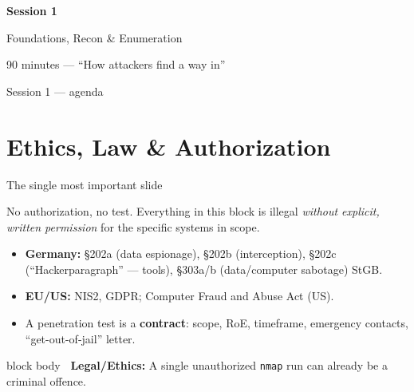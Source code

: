 \documentclass[aspectratio=169,11pt]{beamer}
\newcommand{\legalbox}[1]{%
  \begin{beamercolorbox}[wd=\textwidth,sep=6pt,rounded=true]{block body}%
  \color{warnRed}\textbf{\faExclamationTriangle\ Legal/Ethics:} #1%
  \end{beamercolorbox}}
\newcommand{\sessionbanner}[3]{%
  \begin{frame}[standout]
    {\Large\textbf{Session #1}}\par\vspace{0.6em}
    {#2}\par\vspace{0.8em}
    {\small\color{kaliBlue}#3}
  \end{frame}}
\begin{document}
\sessionbanner{1}{Foundations, Recon \& Enumeration}{90 minutes --- ``How attackers find a way in''}

\begin{frame}{Session 1 --- agenda}\tableofcontents[sections={1-6}]\end{frame}

\section{Ethics, Law \& Authorization}
\begin{frame}{The single most important slide}
  \begin{alertblock}{No authorization, no test.}
    Everything in this block is illegal \emph{without explicit, written
    permission} for the specific systems in scope.
  \end{alertblock}
  \vspace{0.4em}
  \begin{itemize}
    \item \textbf{Germany:} \S202a (data espionage), \S202b (interception),
          \S202c (``Hackerparagraph'' --- tools), \S303a/b (data/computer
          sabotage) StGB.
    \item \textbf{EU/US:} NIS2, GDPR; Computer Fraud and Abuse Act (US).
    \item A penetration test is a \textbf{contract}: scope, RoE, timeframe,
          emergency contacts, ``get-out-of-jail'' letter.
  \end{itemize}
  \legalbox{A single unauthorized \texttt{nmap} run can already be a criminal
  offence.}
\end{frame}
\end{document}
